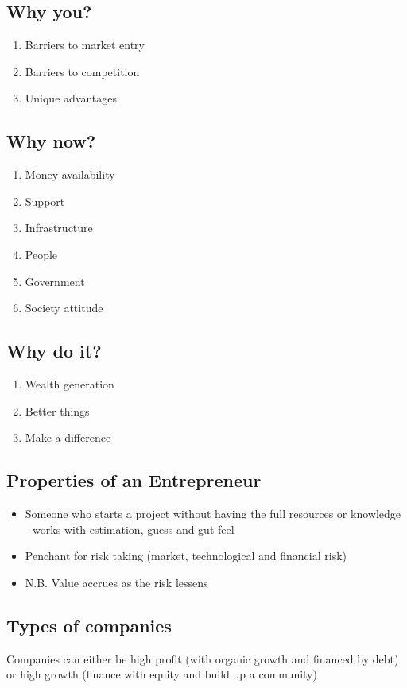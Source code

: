 \documentclass{article}
\begin{document}
\begin{multicols}{2}
\subsection{Why you?}
\begin{enumerate}
    \item Barriers to market entry
    \item Barriers to competition
    \item Unique advantages
\end{enumerate}

\subsection{Why now?}
\begin{enumerate}
    \item Money availability
    \item Support
    \item Infrastructure
    \item People
    \item Government
    \item Society attitude
\end{enumerate}

\subsection{Why do it?}
\begin{enumerate}
    \item Wealth generation
    \item Better things
    \item Make a difference
\end{enumerate}

\subsection{Properties of an Entrepreneur}
\begin{itemize}
    \item Someone who starts a project without having the full resources or knowledge - works with estimation, guess and gut feel
    \item Penchant for risk taking (market, technological and financial risk)
    \item N.B. Value accrues as the risk lessens
\end{itemize}

\subsection{Types of companies}
Companies can either be high profit (with organic growth and financed by debt) or high growth (finance with equity and build up a community)


\end{multicols}
\end{document}

